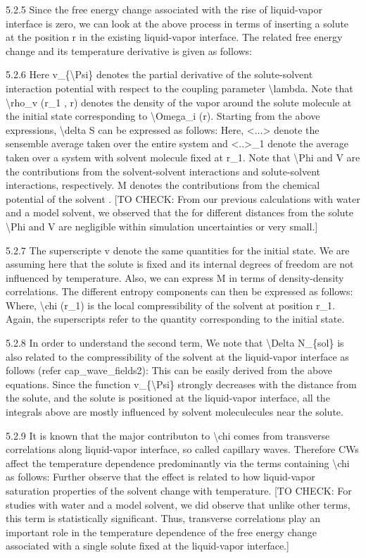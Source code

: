 \par 5.2.5 Since the free energy change associated with the rise of liquid-vapor interface is zero, we can look at the above process in terms of inserting a solute at the position r in the existing liquid-vapor interface. The related free energy change and its temperature derivative is given as follows:
\par 5.2.6 Here v\_\{\textbackslash Psi\} denotes the partial derivative of the solute-solvent interaction potential with respect to the coupling parameter \textbackslash lambda. Note that \textbackslash rho\_v (r\_1 , r) denotes the density of the vapor around the solute molecule at the initial state corresponding to \textbackslash Omega\_i (r). Starting from the above expressions, \textbackslash delta S can be expressed as follows: Here, <...> denote the sensemble average taken over the entire system and <..>\_1 denote the average taken over a system with solvent molecule fixed at r\_1.  Note that \textbackslash Phi and V are the contributions from the solvent-solvent interactions and solute-solvent interactions, respectively. M denotes the contributions from the chemical potential of the solvent . [TO CHECK: From our previous calculations with water and a model solvent, we observed that the for different distances from the solute \textbackslash Phi and V are negligible within simulation uncertainties or very small.]
\par 5.2.7 The superscripte v denote the same quantities for the initial state. We are assuming here that the solute is fixed and its internal degrees of freedom are not influenced by temperature. Also, we can express M in terms of density-density correlations. The different entropy components can then be expressed as follows: Where, \textbackslash chi (r\_1) is the local compressibility of the solvent at position r\_1. Again, the superscripts  refer to the quantity corresponding to the initial state.
\par 5.2.8 In order to understand the second term, We note that \textbackslash Delta N\_\{sol\} is also related to the compressibility of the solvent at the liquid-vapor interface as follows (refer cap\_wave\_fields2):  This can be easily derived from the above equations. Since the function v\_\{\textbackslash Psi\} strongly decreases with the distance from the solute, and the solute is positioned at the liquid-vapor interface, all the integrals above are mostly influenced by solvent moleculecules near the solute.
\par 5.2.9  It is known that the major contributon to \textbackslash chi comes from transverse correlations along liquid-vapor interface, so called capillary waves. Therefore CWs affect the temperature dependence predominantly via the terms containing \textbackslash chi as follows: Further observe that the effect is related to how liquid-vapor saturation properties of the solvent change with temperature. [TO CHECK: For studies with water and a model solvent, we did observe that unlike other terms, this term is statistically significant. Thus, transverse correlations play an important role in the temperature dependence of the free energy change associated with a single solute fixed at the liquid-vapor interface.]
